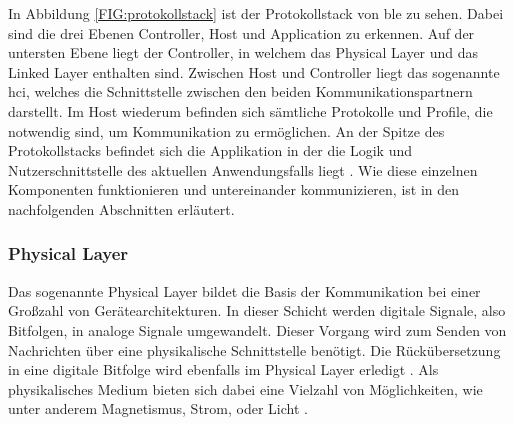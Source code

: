 \noindent In Abbildung \ref{FIG:protokollstack} ist der Protokollstack von \ac{ble} zu sehen. Dabei sind die drei Ebenen Controller, Host und Application zu erkennen. Auf der untersten Ebene liegt der Controller, in welchem das Physical Layer und das Linked Layer enthalten sind. Zwischen Host und Controller liegt das sogenannte \ac{hci}, welches die Schnittstelle zwischen den beiden Kommunikationspartnern darstellt. Im Host wiederum befinden sich sämtliche Protokolle und Profile, die notwendig sind, um Kommunikation zu ermöglichen. An der Spitze des Protokollstacks befindet sich die Applikation in der die Logik und Nutzerschnittstelle des aktuellen Anwendungsfalls liegt \cite[15]{Townsend14:GSB}. Wie diese einzelnen Komponenten funktionieren und untereinander kommunizieren, ist in den nachfolgenden Abschnitten erläutert.\\  

\subsubsection{Physical Layer}
\label{sss:funktionsweise:physical}

Das sogenannte Physical Layer bildet die Basis der Kommunikation bei einer Großzahl von Gerätearchitekturen. In dieser Schicht werden digitale Signale, also Bitfolgen, in analoge Signale umgewandelt. Dieser Vorgang wird zum Senden von Nachrichten über eine physikalische Schnittstelle benötigt. Die Rückübersetzung in eine digitale Bitfolge wird ebenfalls im Physical Layer erledigt \cite[Seite 16]{Townsend14:GSB}. Als physikalisches Medium bieten sich dabei eine Vielzahl von Möglichkeiten, wie unter anderem Magnetismus, Strom, oder Licht \cite[Seite 95 - 101]{Tanenbaum14:CN}.\\

